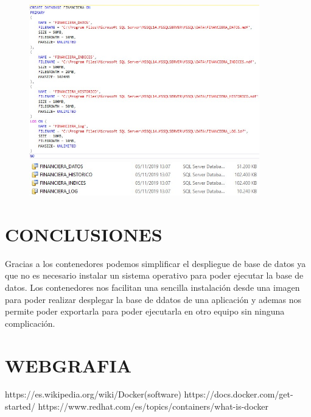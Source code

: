 \documentclass[preprint,12pt]{elsarticle}
\begin{document}
\begin{enumerate}[a)]
\begin{figure}[htb]
\begin{center}
		\includegraphics[width=10cm]{./IMAGENES/Docker14}
		\includegraphics[width=10cm]{./IMAGENES/Docker15}
	\end{center}
\end{figure}
\end{enumerate}



\section{CONCLUSIONES}
Gracias a los contenedores podemos simplificar el despliegue de base de datos ya que no es necesario instalar un sistema operativo para poder ejecutar la base de datos. Los contenedores nos facilitan una sencilla instalación desde una imagen para poder realizar desplegar la base de ddatos de una aplicación y ademas nos permite poder exportarla para poder ejecutarla en otro equipo sin ninguna complicación.

\section{WEBGRAFIA}
https://es.wikipedia.org/wiki/Docker(software)\newline
https://docs.docker.com/get-started/\newline
https://www.redhat.com/es/topics/containers/what-is-docker\newline
\end{document}
